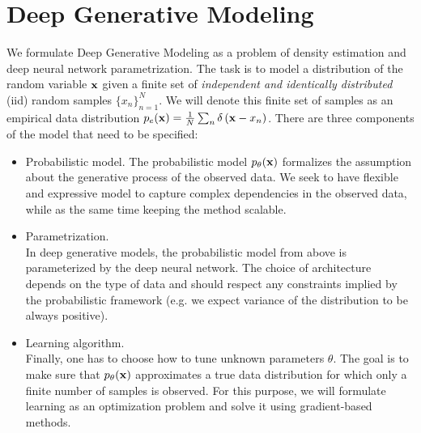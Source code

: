 \section{Deep Generative Modeling}\label{sec:intro_generative_models_types}
We formulate Deep Generative Modeling as a problem of density estimation and deep neural network parametrization. 
The task is to model a distribution of the random variable ${\mathbf{x}}$ given a finite set of \textit{independent and identically distributed} (iid) random samples $\{x_n\}_{n=1}^N$. 
We will denote this finite set of samples as an empirical data distribution $p_e({\mathbf{x}}) = \frac1N \sum_n \delta\left({\mathbf{x}} - x_n\right)$. 
There are three components of the model that need to be specified:
\begin{itemize}
\item Probabilistic model. \newline 
{}
The probabilistic model $p_{\theta}({\mathbf{x}})$ formalizes the assumption about the generative process of the observed data. 
We seek to have flexible and expressive model to capture complex dependencies in the observed data, while as the same time keeping the method scalable.


\item Parametrization.\\
In deep generative models, the probabilistic model from above is parameterized by the deep neural network. 
The choice of architecture depends on the type of data and should respect any constraints implied by the probabilistic framework (e.g. we expect variance of the distribution to be always positive).

\item Learning algorithm. \\
Finally, one has to choose how to tune unknown parameters $\theta$. The goal is to make sure that $p_{\theta}({\mathbf{x}})$ approximates a true data distribution for which only a finite number of samples is observed. For this purpose, we will formulate learning as an optimization problem and solve it using gradient-based methods. 
\end{itemize}

